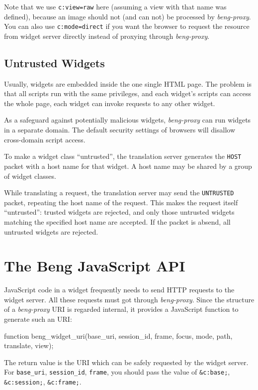 \documentclass[a4paper,12pt]{article}
\begin{document}
Note that we use \texttt{c:view=raw} here (assuming a view with that
name was defined), because an image should
not (and can not) be processed by \emph{beng-proxy}.  You can also use
\texttt{c:mode=direct} if you want the browser to request the resource
from widget server directly instead of proxying through
\emph{beng-proxy}.

\subsection{Untrusted Widgets}

Usually, widgets are embedded inside the one single HTML page.  The
problem is that all scripts run with the same privileges, and each
widget's scripts can access the whole page, each widget can invoke
requests to any other widget.

As a safeguard against potentially malicious widgets,
\emph{beng-proxy} can run widgets in a separate domain.  The default
security settings of browsers will disallow cross-domain script
access.

To make a widget class ``untrusted'', the translation server generates
the \texttt{HOST} packet with a host name for that widget.  A host
name may be shared by a group of widget classes.

While translating a request, the translation server may send the
\verb|UNTRUSTED| packet, repeating the host name of the request.
This makes the request itself ``untrusted'': trusted widgets are
rejected, and only those untrusted widgets matching the specified host
name are accepted.  If the packet is absend, all untrusted widgets are
rejected.


\section{The Beng JavaScript API}

JavaScript code in a widget frequently needs to send HTTP requests to
the widget server.  All these requests must got through
\emph{beng-proxy}.  Since the structure of a \emph{beng-proxy} URI is
regarded internal, it provides a JavaScript function to generate such
an URI:

\begin{verbatim*}
function
beng_widget_uri(base_uri, session_id, frame, focus, mode,
                path, translate, view);
\end{verbatim*}

The return value is the URI which can be safely requested by the
widget server.  For \texttt{base\_uri}, \texttt{session\_id},
\texttt{frame}, you should pass the value of \texttt{\&c:base;},
\texttt{\&c:session;}, \texttt{\&c:frame;}.
\end{document}
